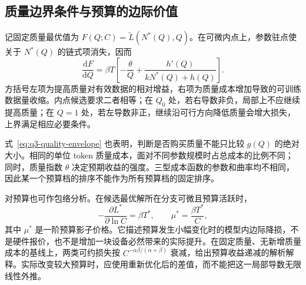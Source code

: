 \subsection{质量边界条件与预算的边际价值}
记固定质量最优值为 $F(Q;C)=\widetilde L(N^*(Q),Q)$。在可微内点上，参数驻点使关于 $N^*(Q)$ 的链式项消失，因而
\begin{equation}
\frac{\mathrm dF}{\mathrm dQ}
=\beta T\left[-\frac{\theta}{Q}+\frac{h'(Q)}{kN^*(Q)+h(Q)}\right].
\label{eq:q3-quality-envelope}
\end{equation}
方括号左项为提高质量对有效数据的相对增益，右项为质量成本增加导致的可训练数据量收缩。内点候选要求二者相等；在 $Q_0$ 处，若右导数非负，局部上不应继续提高质量；在 $Q=1$ 处，若左导数非正，继续沿可行方向降低质量会增大损失，上界满足相应必要条件。

式~\eqref{eq:q3-quality-envelope} 也表明，判断是否购买质量不能只比较 $g(Q)$ 的绝对大小。相同的单位 token 质量成本，面对不同参数规模时占总成本的比例不同；同时，质量指数 $\theta$ 决定预期收益的强度。三型成本函数的参数和曲率均不相同，因此某一个预算档的排序不能作为所有预算档的固定排序。

对预算也可作包络分析。在候选最优解所在分支可微且预算活跃时，
\begin{equation}
-\frac{\partial L^*}{\partial\ln C}=\beta T^*,
\qquad \mu^*=\frac{\beta T^*}{C},
\label{eq:q3-budget-value}
\end{equation}
其中 $\mu^*$ 是一阶预算影子价格。它描述预算发生小幅变化时的模型内边际降损，不是硬件报价，也不是增加一块设备必然带来的实际提升。在固定质量、无新增质量成本的基线上，两类可约损失按 $C^{-\alpha\beta/(\alpha+\beta)}$ 衰减，给出预算收益递减的解析解释。实际改变较大预算时，应使用重新优化后的差值，而不能把这一局部导数无限线性外推。
